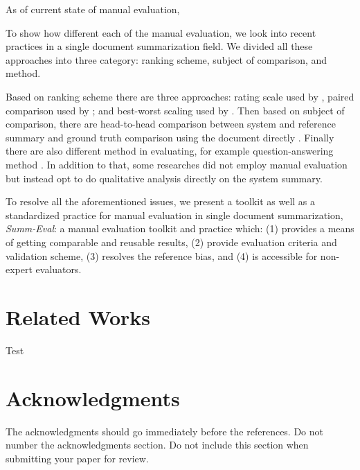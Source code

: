 \documentclass[11pt,a4paper]{article}
\begin{document}
As of current state of manual evaluation, 

To show how different each of the manual evaluation, we look into recent practices in a single document summarization field. We divided all these approaches into three category: ranking scheme, subject of comparison, and method. 

Based on ranking scheme there are three approaches: rating scale \citep{Likert1932} used by \citet{Kryscinski2018}, paired comparison \citep{Thurstone1994} used by \citet{Fan2018, Celikyilmaz2018}; and best-worst scaling \citep{Woodworth1991} used by \citet{Shashi2018}. Then based on subject of comparison, there are head-to-head comparison between system and reference summary \citep{Celikyilmaz2018} and ground truth comparison using the document directly \citep{Shashi2018, Kryscinski2018}. Finally there are also different method in evaluating, for example question-answering method \citep{Clarke2010, Shashi2018}. In addition to that, some researches \citep{Nallapati2016a, See2017, Gehrmann2018} did not employ manual evaluation but instead opt to do qualitative analysis directly on the system summary.

To resolve all the aforementioned issues, we present a toolkit as well as a standardized practice for manual evaluation in single document summarization, \textit{Summ-Eval}: a manual evaluation toolkit and practice which: (1) provides a means of getting comparable and reusable results, (2) provide evaluation criteria and validation scheme, (3) resolves the reference bias, and (4) is accessible for non-expert evaluators.

\section{Related Works}
Test

\section*{Acknowledgments}

The acknowledgments should go immediately before the references.  Do
not number the acknowledgments section. Do not include this section
when submitting your paper for review.




\appendix
\end{document}
